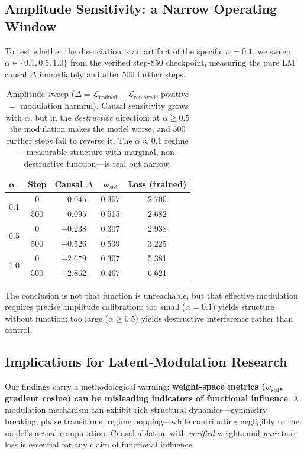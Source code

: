 \documentclass[11pt,a4paper]{article}
\newcommand{\wstd}{w_{\mathrm{std}}}
\begin{document}
\subsection{Amplitude Sensitivity: a Narrow Operating Window}

To test whether the dissociation is an artifact of the specific $\alpha=0.1$, we sweep
$\alpha\in\{0.1,0.5,1.0\}$ from the verified step-$850$ checkpoint, measuring the pure
LM causal $\Delta$ immediately and after $500$ further steps.

\begin{table}[h]
\centering
\begin{tabular}{lcccc}
\toprule
$\boldsymbol{\alpha}$ & \textbf{Step} & \textbf{Causal $\Delta$} & $\boldsymbol{\wstd}$ & \textbf{Loss (trained)} \\
\midrule
\multirow{2}{*}{0.1} & 0   & $-0.045$ & 0.307 & 2.700 \\
                     & 500 & $+0.095$ & 0.515 & 2.682 \\
\midrule
\multirow{2}{*}{0.5} & 0   & $+0.238$ & 0.307 & 2.938 \\
                     & 500 & $+0.526$ & 0.539 & 3.225 \\
\midrule
\multirow{2}{*}{1.0} & 0   & $+2.679$ & 0.307 & 5.381 \\
                     & 500 & $+2.862$ & 0.467 & 6.621 \\
\bottomrule
\end{tabular}
\caption{Amplitude sweep ($\Delta = \mathcal{L}_{\text{trained}}-\mathcal{L}_{\text{removed}}$,
positive $=$ modulation harmful). Causal sensitivity grows with $\alpha$, but in the
\emph{destructive} direction: at $\alpha\geq0.5$ the modulation makes the model worse,
and $500$ further steps fail to reverse it. The $\alpha\approx0.1$ regime---measurable
structure with marginal, non-destructive function---is real but narrow.}
\end{table}

The conclusion is not that function is unreachable, but that effective modulation
requires precise amplitude calibration: too small ($\alpha=0.1$) yields structure
without function; too large ($\alpha\geq0.5$) yields destructive interference rather
than control.

\subsection{Implications for Latent-Modulation Research}

Our findings carry a methodological warning: \textbf{weight-space metrics ($\wstd$,
gradient cosine) can be misleading indicators of functional influence}. A modulation
mechanism can exhibit rich structural dynamics---symmetry breaking, phase transitions,
regime hopping---while contributing negligibly to the model's actual computation.
Causal ablation with \emph{verified} weights and \emph{pure} task loss is essential for
any claim of functional influence.
\end{document}
